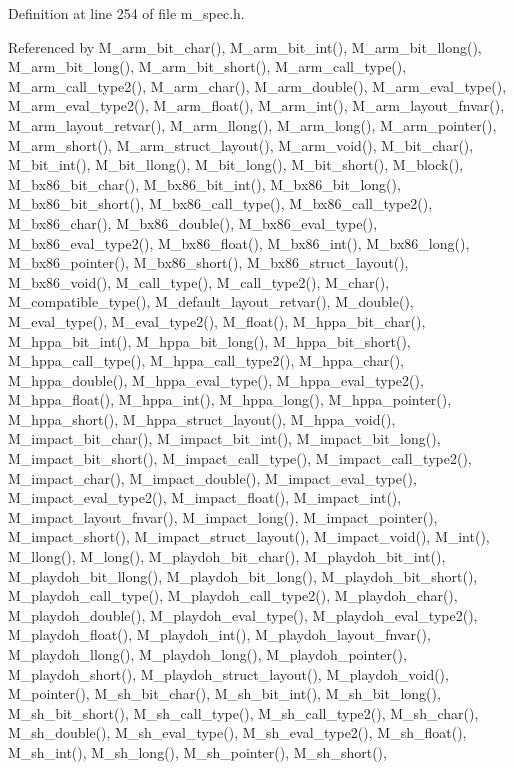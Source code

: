 Definition at line 254 of file m\_\-spec.h.

Referenced by M\_\-arm\_\-bit\_\-char(), M\_\-arm\_\-bit\_\-int(), M\_\-arm\_\-bit\_\-llong(), M\_\-arm\_\-bit\_\-long(), M\_\-arm\_\-bit\_\-short(), M\_\-arm\_\-call\_\-type(), M\_\-arm\_\-call\_\-type2(), M\_\-arm\_\-char(), M\_\-arm\_\-double(), M\_\-arm\_\-eval\_\-type(), M\_\-arm\_\-eval\_\-type2(), M\_\-arm\_\-float(), M\_\-arm\_\-int(), M\_\-arm\_\-layout\_\-fnvar(), M\_\-arm\_\-layout\_\-retvar(), M\_\-arm\_\-llong(), M\_\-arm\_\-long(), M\_\-arm\_\-pointer(), M\_\-arm\_\-short(), M\_\-arm\_\-struct\_\-layout(), M\_\-arm\_\-void(), M\_\-bit\_\-char(), M\_\-bit\_\-int(), M\_\-bit\_\-llong(), M\_\-bit\_\-long(), M\_\-bit\_\-short(), M\_\-block(), M\_\-bx86\_\-bit\_\-char(), M\_\-bx86\_\-bit\_\-int(), M\_\-bx86\_\-bit\_\-long(), M\_\-bx86\_\-bit\_\-short(), M\_\-bx86\_\-call\_\-type(), M\_\-bx86\_\-call\_\-type2(), M\_\-bx86\_\-char(), M\_\-bx86\_\-double(), M\_\-bx86\_\-eval\_\-type(), M\_\-bx86\_\-eval\_\-type2(), M\_\-bx86\_\-float(), M\_\-bx86\_\-int(), M\_\-bx86\_\-long(), M\_\-bx86\_\-pointer(), M\_\-bx86\_\-short(), M\_\-bx86\_\-struct\_\-layout(), M\_\-bx86\_\-void(), M\_\-call\_\-type(), M\_\-call\_\-type2(), M\_\-char(), M\_\-compatible\_\-type(), M\_\-default\_\-layout\_\-retvar(), M\_\-double(), M\_\-eval\_\-type(), M\_\-eval\_\-type2(), M\_\-float(), M\_\-hppa\_\-bit\_\-char(), M\_\-hppa\_\-bit\_\-int(), M\_\-hppa\_\-bit\_\-long(), M\_\-hppa\_\-bit\_\-short(), M\_\-hppa\_\-call\_\-type(), M\_\-hppa\_\-call\_\-type2(), M\_\-hppa\_\-char(), M\_\-hppa\_\-double(), M\_\-hppa\_\-eval\_\-type(), M\_\-hppa\_\-eval\_\-type2(), M\_\-hppa\_\-float(), M\_\-hppa\_\-int(), M\_\-hppa\_\-long(), M\_\-hppa\_\-pointer(), M\_\-hppa\_\-short(), M\_\-hppa\_\-struct\_\-layout(), M\_\-hppa\_\-void(), M\_\-impact\_\-bit\_\-char(), M\_\-impact\_\-bit\_\-int(), M\_\-impact\_\-bit\_\-long(), M\_\-impact\_\-bit\_\-short(), M\_\-impact\_\-call\_\-type(), M\_\-impact\_\-call\_\-type2(), M\_\-impact\_\-char(), M\_\-impact\_\-double(), M\_\-impact\_\-eval\_\-type(), M\_\-impact\_\-eval\_\-type2(), M\_\-impact\_\-float(), M\_\-impact\_\-int(), M\_\-impact\_\-layout\_\-fnvar(), M\_\-impact\_\-long(), M\_\-impact\_\-pointer(), M\_\-impact\_\-short(), M\_\-impact\_\-struct\_\-layout(), M\_\-impact\_\-void(), M\_\-int(), M\_\-llong(), M\_\-long(), M\_\-playdoh\_\-bit\_\-char(), M\_\-playdoh\_\-bit\_\-int(), M\_\-playdoh\_\-bit\_\-llong(), M\_\-playdoh\_\-bit\_\-long(), M\_\-playdoh\_\-bit\_\-short(), M\_\-playdoh\_\-call\_\-type(), M\_\-playdoh\_\-call\_\-type2(), M\_\-playdoh\_\-char(), M\_\-playdoh\_\-double(), M\_\-playdoh\_\-eval\_\-type(), M\_\-playdoh\_\-eval\_\-type2(), M\_\-playdoh\_\-float(), M\_\-playdoh\_\-int(), M\_\-playdoh\_\-layout\_\-fnvar(), M\_\-playdoh\_\-llong(), M\_\-playdoh\_\-long(), M\_\-playdoh\_\-pointer(), M\_\-playdoh\_\-short(), M\_\-playdoh\_\-struct\_\-layout(), M\_\-playdoh\_\-void(), M\_\-pointer(), M\_\-sh\_\-bit\_\-char(), M\_\-sh\_\-bit\_\-int(), M\_\-sh\_\-bit\_\-long(), M\_\-sh\_\-bit\_\-short(), M\_\-sh\_\-call\_\-type(), M\_\-sh\_\-call\_\-type2(), M\_\-sh\_\-char(), M\_\-sh\_\-double(), M\_\-sh\_\-eval\_\-type(), M\_\-sh\_\-eval\_\-type2(), M\_\-sh\_\-float(), M\_\-sh\_\-int(), M\_\-sh\_\-long(), M\_\-sh\_\-pointer(), M\_\-sh\_\-short(), 